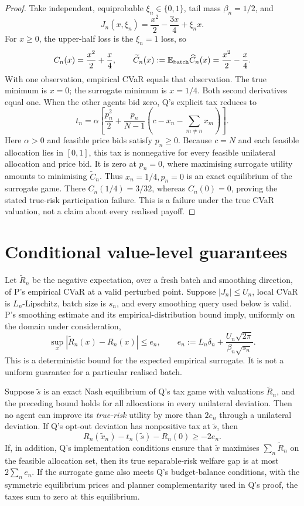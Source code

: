 \documentclass{article}
\begin{document}
\begin{proof}
Take independent, equiprobable \(\xi_n\in\{0,1\}\), tail mass \(\beta_n=1/2\), and
\[
J_n(x,\xi_n)=\frac{x^2}{2}-\frac{3x}{4}+\xi_n x.
\]
For \(x\geq0\), the upper-half loss is the \(\xi_n=1\) loss, so
\[
C_n(x)=\frac{x^2}{2}+\frac{x}{4},
\qquad
\widetilde C_n(x):=\mathbb E_{\rm batch}\widehat C_n(x)
=\frac{x^2}{2}-\frac{x}{4}.
\]
With one observation, empirical CVaR equals that observation. The true minimum is \(x=0\); the surrogate minimum is \(x=1/4\). Both second derivatives equal one. When the other agents bid zero, Q's explicit tax reduces to
\[
t_n=\alpha\left[\frac{p_n^2}{2}+\frac{p_n}{N-1}
\left(c-x_n-\sum_{m\ne n}x_m\right)\right].
\]
Here \(\alpha>0\) and feasible price bids satisfy \(p_n\geq0\). Because \(c=N\) and each feasible allocation lies in \([0,1]\), this tax is nonnegative for every feasible unilateral allocation and price bid. It is zero at \(p_n=0\), where maximising surrogate utility amounts to minimising \(\widetilde C_n\). Thus \(x_n=1/4,p_n=0\) is an exact equilibrium of the surrogate game. There \(C_n(1/4)=3/32\), whereas \(C_n(0)=0\), proving the stated true-risk participation failure. This is a failure under the true CVaR valuation, not a claim about every realised payoff. %
\end{proof}

\section{Conditional value-level guarantees}

Let \(\widetilde R_n\) be the negative expectation, over a fresh batch and smoothing direction, of P's empirical CVaR at a valid perturbed point. Suppose \(|J_n|\leq U_n\), local CVaR is \(L_n\)-Lipschitz, batch size is \(s_n\), and every smoothing query used below is valid. P's smoothing estimate and its empirical-distribution bound imply, uniformly on the domain under consideration,
\[
\sup_x|\widetilde R_n(x)-R_n(x)|\leq e_n,
\qquad e_n:=L_n\delta_n+
\frac{U_n\sqrt{2\pi}}{\beta_n\sqrt{s_n}}.
\]
This is a deterministic bound for the expected empirical surrogate. It is not a uniform guarantee for a particular realised batch. %

\begin{proposition}
Suppose \(\widetilde s\) is an exact Nash equilibrium of Q's tax game with valuations \(\widetilde R_n\), and the preceding bound holds for all allocations in every unilateral deviation. Then no agent can improve its \emph{true-risk} utility by more than \(2e_n\) through a unilateral deviation. If Q's opt-out deviation has nonpositive tax at \(\widetilde s\), then
\[
R_n(\widetilde x_n)-t_n(\widetilde s)-R_n(0)\geq-2e_n.
\]
If, in addition, Q's implementation conditions ensure that \(\widetilde x\) maximises \(\sum_n\widetilde R_n\) on the feasible allocation set, then its true separable-risk welfare gap is at most \(2\sum_n e_n\). If the surrogate game also meets Q's budget-balance conditions, with the symmetric equilibrium prices and planner complementarity used in Q's proof, the taxes sum to zero at this equilibrium. %
\end{proposition}
\end{document}
